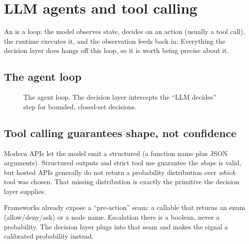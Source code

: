 \chapter{LLM agents and tool calling}
\label{ch:agents}

An  is a loop: the model observes state, decides on an action (usually a
tool call), the runtime executes it, and the observation feeds back in. Everything the
decision layer does hangs off this loop, so it is worth being precise about it.

\section{The agent loop}

\begin{figure}[h]\centering
{}
\caption{The agent loop. The decision layer intercepts the ``LLM decides'' step for
bounded, closed-set decisions.}
\label{fig:agentloop}
\end{figure}

\section{Tool calling guarantees shape, not confidence}

Modern APIs let the model emit a structured  (a function name plus JSON
arguments). Structured outputs and strict tool use guarantee the \emph{shape} is valid, but
hosted APIs generally do not return a probability distribution over \emph{which} tool was
chosen. That missing distribution is exactly the primitive the decision layer supplies.

\begin{keyidea}
Frameworks already expose a ``pre-action'' seam: a callable that returns an enum
(allow/deny/ask) or a node name. Escalation there is a boolean, never a probability. The
decision layer plugs into that seam and makes the signal a calibrated probability instead.
\end{keyidea}

